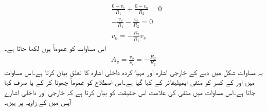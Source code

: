 \begin{align}
& \frac{0-v_s}{R_1}+\frac{0-v_o}{R_2}=0 \nonumber \\
& -\frac{v_s}{R_1}-\frac{v_o}{R_2}=0 \nonumber \\
& v_o =-\frac{R_2}{R_1} v_s
\end{align}
اس مساوات کو عموماً یوں لکھا جاتا ہے۔
\begin{align} \label{مساوات_منفی_افزائش}
A_v=\frac{v_o}{ v_s}=- \frac{R_2}{R_1}
\end{align}
	یہ مساوات شکل   میں دیے  کے خارجی اشارہ   اور مہیا کردہ داخلی اشارہ  کا تعلق بیان کرتا ہے۔اس مساوات میں  اور  کے کسر کو منفی ایمپلیفائر کے   کہا گیا ہے۔اس اصطلاح کو عموماً چھوٹا کر کے  یا صرف  کہا جاتا ہے۔اس مساوات میں منفی کی علامت اس حقیقت کو بیان کرتا ہے کہ خارجی اور داخلی اشارے آپس میں  کے زاویہ پر ہیں۔

